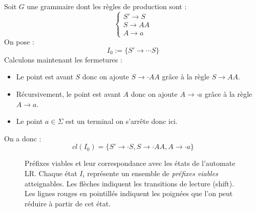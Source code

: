 \begin{example}
    Soit $G$ une grammaire dont les règles de production sont : 
        \[ 
            \begin{cases}
                S' \to S \\ 
                S \to AA \\ 
                A \to a 
            \end{cases}
        \] 
    On pose : 
        $$ I_0 := \{S' \to \cdots S\} $$ 
    Calculons maintenant les fermetures : 
    \begin{itemize}
        \item Le point est avant $S$ donc on ajoute $ S \to \cdot AA$ grâce à la règle $ S \to AA$. 
        \item Récursivement, le point est avant $A$ donc on ajoute $ A \to \cdot a$ grâce à la règle $A \to a$. 
        \item Le point $a \in \Sigma$ est un terminal on s'arrête donc ici. 
    \end{itemize}
    On a donc : 
        \[ cl(I_0) = \{S' \to \cdot S, S \to \cdot AA, A \to \cdot a\} \]
\end{example}

\begin{figure}[htbp]
    \centering
    \caption{Préfixes viables et leur correspondance avec les états de l'automate LR. 
    Chaque état $I_i$ représente un ensemble de \emph{préfixes viables} atteignables. 
    Les flèches indiquent les transitions de lecture (shift). Les lignes rouges en pointillés indiquent 
    les poignées que l'on peut réduire à partir de cet état.}
\end{figure}



